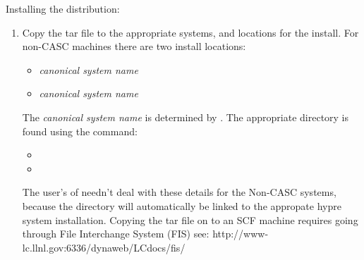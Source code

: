 Installing the \hypre{} distribution:

\begin{enumerate}

   \item Copy the tar file  to the 
   appropriate systems, and locations for the install. For non-CASC 
   machines there are two install locations:
      \begin{itemize}
       \item {}\textit{canonical system name}
       \item {}\textit{canonical system name}
      \end{itemize}
   The \textit{canonical system name} is determined by 
   . The appropriate directory is found using
   the command:
      \begin{itemize}
       \item {}
       \item {}
      \end{itemize}
   The user's of \hypre{} needn't deal with these details for the 
   Non-CASC systems, because the  directory
   will automatically be linked to the appropate hypre system 
   installation.
   Copying the tar file on to an SCF machine requires going through
   File Interchange System (FIS) see: 
   http://www-lc.llnl.gov:6336/dynaweb/LCdocs/fis/



\end{enumerate}
